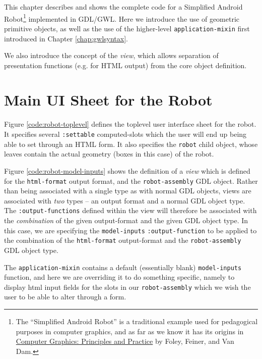 \documentclass [11pt]{book}
\begin{document}
\label{chap:example2:simplifiedandroidrobot}

This chapter describes and shows the complete code for a Simplified Android Robot\footnote{The ``Simplified Android Robot'' is a traditional example used for pedagogical 
purposes in computer graphics, and as far as we know it has its origins in 
\underline{Computer Graphics: Principles and Practice} by Foley, Feiner, and Van Dam.} implemented in GDL/GWL. Here we introduce the use of geometric primitive objects, 
as well as the use of the higher-level \texttt{application-mixin} first introduced in Chapter 
\ref{chap:gwlsyntax}.

We also introduce the concept of the \emph{view}, which allows separation of presentation functions (e.g. for HTML output) from the
core object definition.

\section{Main UI Sheet for the Robot}

\label{sec:mainuisheetfortherobot}

Figure 
\ref{code:robot-toplevel} defines the toplevel user interface sheet for the robot.
It specifies several \texttt{:settable} computed-slots which the user will end up being able to set through an HTML form.
It also specifies the \texttt{robot} child object, whose leaves contain the actual geometry (boxes in this
case) of the robot.

Figure 
\ref{code:robot-model-inputs} shows the definition of a \emph{view} which is defined for the \texttt{html-format} output format, and the \texttt{robot-assembly} GDL object. Rather than being associated with a single type
as with normal GDL objects, views are associated with \emph{two} types -- an output format and a normal GDL object type. The \texttt{:output-functions} defined within the view will therefore be associated with the \emph{combination} of the given output-format and the given GDL object type. In 
this case, we are specifying the \texttt{model-inputs} \texttt{:output-function} to be applied to the combination of the \texttt{html-format} output-format and the \texttt{robot-assembly} GDL object type.

The \texttt{application-mixin} contains a default (essentially blank) \texttt{model-inputs} function, and here we are overriding it to do something specific, namely
to display html input fields for the slots in our \texttt{robot-assembly} which we wish the user to be able to alter through a form.
\end{document}
